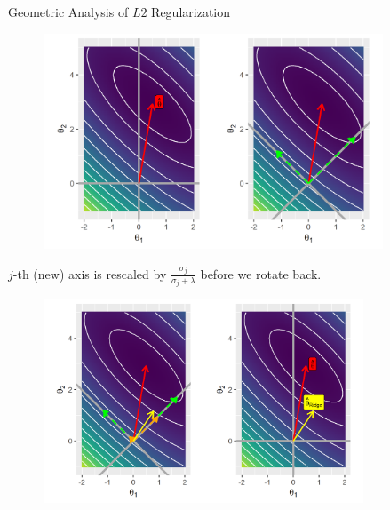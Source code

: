 \documentclass[11pt,compress,t,notes=noshow, xcolor=table]{beamer}
\begin{document}
\begin{vbframe}{Geometric Analysis of $L2$ Regularization}
\begin{figure}
\includegraphics[width=0.9\textwidth]{figure/l2_reg_hess_01_plot.png}\\
\end{figure}




\framebreak
  
$j$-th (new) axis is rescaled by $\frac{\sigma_j}{\sigma_j + \lambda}$ before we rotate back.

\begin{figure}
\includegraphics[width=0.85\textwidth]{figure/l2_reg_hess_03_plot.png}\\
\end{figure}



\end{vbframe}
\end{document}
